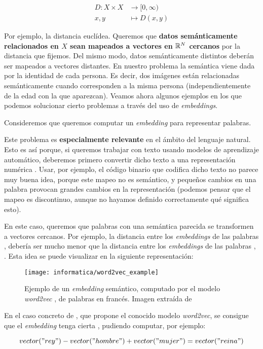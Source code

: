 \begin{equation}
\begin{split}
    D: X \times X & \to [0, \infty) \\
    x, y & \mapsto D(x, y)
\end{split}
\end{equation}

Por ejemplo, la distancia euclídea. Queremos que \textbf{datos semánticamente relacionados en $X$ sean mapeados a vectores en $\mathbb{R}^N$ cercanos} por la distancia que fijemos. Del mismo modo, datos semánticamente distintos deberán ser mapeados a vectores distantes. En nuestro problema la semántica viene dada por la identidad de cada persona. Es decir, dos imágenes están relacionadas semánticamente cuando corresponden a la misma persona (independientemente de la edad con la que aparezcan). Veamos ahora algunos ejemplos en los que podemos solucionar cierto problemas a través del uso de \textit{embeddings}.

\begin{ejemplo}
    Consideremos que queremos computar un \textit{embedding} para representar palabras.

    Este problema es \textbf{especialmente relevante} en el ámbito del lenguaje natural. Esto es así porque, si queremos trabajar con texto usando modelos de aprendizaje automático, deberemos primero convertir dicho texto a una representación numérica \cite{informatica:word_embeddings_survey}. Usar, por ejemplo, el código binario que codifica dicho texto no parece muy buena idea, porque este mapeo no es semántico, y pequeños cambios en una palabra provocan grandes cambios en la representación (podemos pensar que el mapeo es discontinuo, aunque no hayamos definido correctamente qué significa esto).

    En este caso, queremos que palabras con una semántica parecida se transformen a vectores cercanos. Por ejemplo, la distancia entre los \textit{embeddings} de las palabras ,  debería ser mucho menor que la distancia entre los \textit{embeddings} de las palabras , . Esta idea se puede visualizar en la siguiente representación:

    \begin{figure}[H]
        \centering
        \texttt{[image: informatica/word2vec\_example]}
        \caption{Ejemplo de un \textit{embedding} semántico, computado por el modelo \textit{word2vec} \cite{informatica:word2vec}, de palabras en francés. Imagen extraída de \cite{informatica:word2vec_cran_package}}
    \end{figure}

    En el caso concreto de \cite{informatica:word2vec}, que propone el conocido modelo \textit{word2vec}, se consigue que el \textit{embedding} tenga cierta , pudiendo computar, por ejemplo:

    \begin{equation}
        vector("rey") - vector("hombre") + vector("mujer") = vector("reina")
    \end{equation}
\end{ejemplo}

